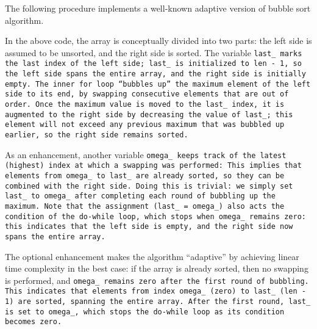 \example The following procedure implements a
well-known adaptive version of bubble sort algorithm.


In the above code, the array is conceptually divided into two parts:
the left side is assumed to be unsorted, and the right side is sorted.
The variable \tt{last_} marks the last index of the left side;
\tt{last_} is initialized to \tt{len - 1}, so the left side
spans the entire array, and the right side is initially empty.
The inner \tt{for} loop ``bubbles up'' the maximum element of the left
side to its end, by swapping consecutive elements that are out of order.
Once the maximum value is moved to the \tt{last_} index, it is augmented to the
right side by decreasing the value of \tt{last_}; this element will not exceed
any previous maximum that was bubbled up earlier, so the right side remains sorted.

As an enhancement, another variable \tt{omega_} keeps track of
the latest (highest) index at which a swapping was performed:
This implies that elements from \tt{omega_} to \tt{last_} are
already sorted, so they can be combined with the right side.
Doing this is trivial: we simply set \tt{last_} to \tt{omega_}
after completing each round of bubbling up the maximum.
Note that the assignment \tt{(last_ = omega_)} also acts the condition of the
\tt{do-while} loop, which stops when \tt{omega_} remains zero: this indicates
that the left side is empty, and the right side now spans the entire array.

\enlargethispage*{\baselineskip}
\enlargethispage*{\baselineskip}

The optional enhancement makes the algorithm ``adaptive''
by achieving linear time complexity in the best case:
if the array is already sorted, then no swapping is
performed, and \tt{omega_} remains zero after the first round of bubbling.
This indicates that elements from index \tt{omega_} (zero) to
\tt{last_} (\tt{len} - 1) are sorted, spanning the entire array.
After the first round, \tt{last_} is set to \tt{omega_},
which stops the \tt{do-while} loop as its condition becomes zero.

\pagebreak

\subsection{}


